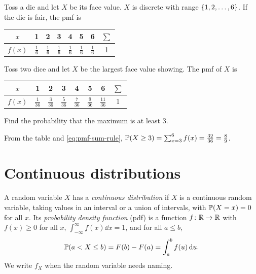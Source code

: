 \begin{example}\label{ex:tossing-a-die}
Toss a die and let $X$ be its face value. $X$ is discrete with range $\left\{ 1, 2, \ldots, 6 \right\}$. If the die is fair, the pmf is
\begin{center}
\renewcommand{\arraystretch}{1.25}
\begin{tabular}{c|ccccccc}
$x$ & 1 & 2 & 3 & 4 & 5 & 6 & $\sum$ \\
\hline
$f(x)$ & $\frac16$ & $\frac16$ & $\frac16$ & $\frac16$ & $\frac16$ & $\frac16$ & 1 \\
\end{tabular}
\end{center}
\end{example}

\begin{example}\label{ex:max-two-dice}
Toss two dice and let $X$ be the largest face value showing. The pmf of $X$ is
\begin{center}
\renewcommand{\arraystretch}{1.25}
\begin{tabular}{c|ccccccc}
$x$ & 1 & 2 & 3 & 4 & 5 & 6 & $\sum$ \\
\hline
$f(x)$ & $\frac{1}{36}$ & $\frac{3}{36}$ & $\frac{5}{36}$ & $\frac{7}{36}$ & $\frac{9}{36}$ & $\frac{11}{36}$ & 1 \\
\end{tabular}
\end{center}
Find the probability that the maximum is at least $3$.
\end{example}

\begin{solution}
From the table and \eqref{eq:pmf-sum-rule}, $\mathbb{P}(X \ge 3) = \sum_{x=3}^{6} f(x) = \frac{32}{36} = \frac89$.
\end{solution}

\section{Continuous distributions}\label{sec:continuous-distributions}

\begin{definition}\label{def:continuous-distribution}
A random variable $X$ has a \emph{continuous distribution} if $X$ is a continuous random variable, taking values in an interval or a union of intervals, with $\mathbb{P}(X = x) = 0$ for all $x$. Its \emph{probability density function} (pdf) is a function $f \colon \mathbb{R} \to \mathbb{R}$ with $f(x) \ge 0$ for all $x$, $\int_{-\infty}^{\infty} f(x) \dd x = 1$, and for all $a \le b$,
\[
  \mathbb{P}(a < X \le b) = F(b) - F(a) = \int_a^b f(u) \mathop{}\!\mathrm{d} u.
\]
We write $f_X$ when the random variable needs naming.
\end{definition}

